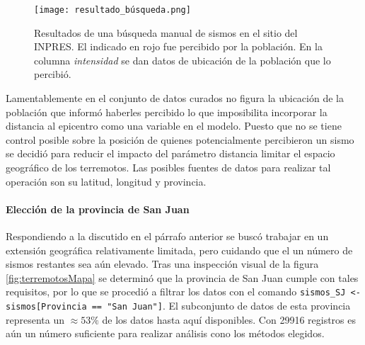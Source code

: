 \documentclass[a4paper]{report}
\begin{document}
\begin{figure}[!ht]
\centering
\texttt{[image: resultado\_búsqueda.png]}
\caption{Resultados de una búsqueda manual de sismos en el sitio del INPRES. El indicado en rojo fue percibido por la población. En la columna \emph{intensidad} se dan datos de ubicación de la población que lo percibió.}
\label{fig:resultado_búsqueda}
\end{figure}

Lamentablemente en el conjunto de datos curados no figura la ubicación de la población que informó haberles percibido lo que imposibilita incorporar la distancia al epicentro como una variable en el modelo.%
Puesto que no se tiene control posible sobre la posición de quienes potencialmente percibieron un sismo se decidió para reducir el impacto del parámetro distancia limitar el espacio geográfico de los terremotos.
Las posibles fuentes de datos para realizar tal operación son su latitud, longitud y provincia.


\paragraph{Elección de la provincia de San Juan}
Respondiendo a la discutido en el párrafo anterior se buscó trabajar en un extensión geográfica relativamente limitada, pero cuidando que el un número de sismos restantes sea aún elevado.
Tras una inspección visual de la figura \ref{fig:terremotosMapa} se determinó  que la provincia de San Juan cumple con tales requisitos, por lo que se procedió a filtrar los datos con el comando \verb'sismos_SJ <- sismos[Provincia == "San Juan"]'.
El subconjunto de datos de esta provincia representa un \(\approx 53 \%\) de los datos hasta aquí disponibles.
Con \num{29916} registros es aún un número suficiente para realizar análisis cono los métodos elegidos.

\end{document}
